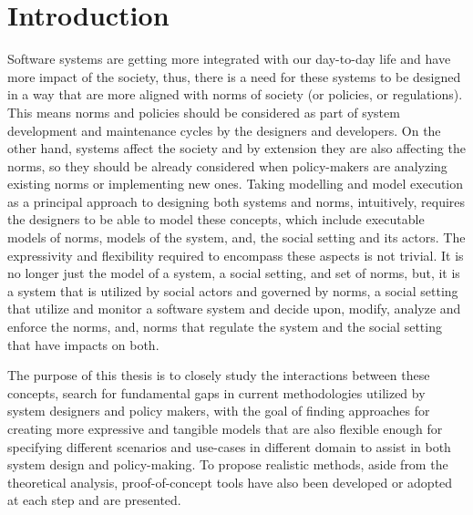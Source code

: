 \chapter{Introduction}
Software systems are getting more integrated with our day-to-day life and have more impact of the society, thus, there is a need for these systems to be designed in a way that are more aligned with norms of society (or policies, or regulations)\cite{Something}. This means norms and policies should be considered as part of system development and maintenance cycles by the designers and developers. On the other hand, systems affect the society and by extension they are also affecting the norms, so they should be already considered when policy-makers are analyzing existing norms or implementing new ones. Taking modelling and model execution as a principal approach to designing both systems and norms, intuitively, requires the designers to be able to model these concepts, which include executable models of norms, models of the system, and, the social setting and its actors. The expressivity and flexibility required to encompass these aspects is not trivial. It is no longer just the model of a system, a social setting, and set of norms, but, it is a system that is utilized by social actors and governed by norms, a social setting that utilize and monitor a software system and decide upon, modify, analyze and enforce the norms, and, norms that regulate the system and the social setting that have impacts on both.


The purpose of this thesis is to closely study the interactions between these concepts, search for fundamental gaps in current methodologies utilized by system designers and policy makers, with the goal of finding approaches for creating more expressive and tangible models that are also flexible enough for specifying different scenarios and use-cases in different domain to assist in both system design and policy-making. To propose realistic methods, aside from the theoretical analysis, proof-of-concept tools have also been developed or adopted at each step and are presented.


